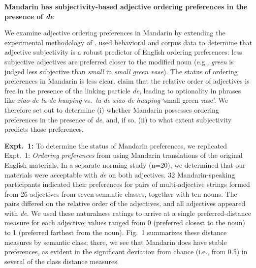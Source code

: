 \documentclass[10pt]{article}
\begin{document}

\begin{center}
	\textbf{Mandarin has subjectivity-based adjective ordering preferences in the presence of \emph{de}}
\end{center}
We examine adjective ordering preferences in Mandarin by extending the experimental methodology of \cite{scontrasetal2017adjectives}. \citeauthor{scontrasetal2017adjectives} used behavioral and corpus data to determine that adjective subjectivity is a robust predictor of English ordering preferences: less subjective adjectives are preferred closer to the modified noun (e.g., \emph{green} is judged less subjective than \emph{small} in \emph{small green vase}). The status of ordering preferences in Mandarin is less clear. \cite{sproatshih1991} claim that the relative order of adjectives is free in the presence of the linking particle \emph{de}, leading to optionality in phrases like \emph{xiao-de lu-de huaping} vs.~\emph{lu-de xiao-de huaping} `small green vase'. We therefore set out to determine (i) whether Mandarin possesses ordering preferences in the presence of \emph{de}, and, if so, (ii) to what extent subjectivity predicts those preferences.

\textbf{Expt.~1:} To determine the status of Mandarin preferences, we replicated Expt.~1: \emph{Ordering preferences} from \citeauthor{scontrasetal2017adjectives} using Mandarin translations of the original English materials. In a separate norming study (n=20), we determined that our materials were acceptable with \emph{de} on both adjectives. 32 Mandarin-speaking participants indicated their preferences for pairs of multi-adjective strings formed from 26 adjectives from seven semantic classes, together with ten nouns. The pairs differed on the relative order of the adjectives, and all adjectives appeared with \emph{de}. We used these naturalness ratings to arrive at a single preferred-distance measure for each adjective; values ranged from 0 (preferred closest to the noun) to 1 (preferred farthest from the noun). Fig.~1 summarizes these distance measures by semantic class; there, we see that Mandarin does have stable preferences, as evident in the significant deviation from chance (i.e., from 0.5) in several of the class distance measures.
\end{document}
